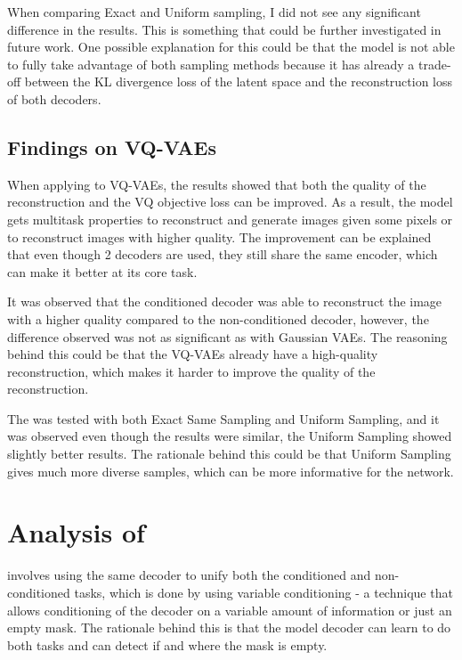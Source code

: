 When comparing Exact and Uniform sampling, I did not see any significant difference in the results. This is something that could be further investigated in future work. One possible explanation for this could be that the model is not able to fully take advantage of both sampling methods because it has already a trade-off between the KL divergence loss of the latent space and the reconstruction loss of both decoders.

\subsection{Findings on VQ-VAEs}

When applying  to VQ-VAEs, the results showed that both the quality of the reconstruction and the VQ objective loss can be improved. As a result, the model gets multitask properties to reconstruct and generate images given some pixels or to reconstruct images with higher quality. The improvement can be explained that even though 2 decoders are used, they still share the same encoder, which can make it better at its core task. 

It was observed that the conditioned decoder was able to reconstruct the image with a higher quality compared to the non-conditioned decoder, however, the difference observed was not as significant as with Gaussian VAEs. The reasoning behind this could be that the VQ-VAEs already have a high-quality reconstruction, which makes it harder to improve the quality of the reconstruction.

The  was tested with both Exact Same Sampling and Uniform Sampling, and it was observed even though the results were similar, the Uniform Sampling showed slightly better results. The rationale behind this could be that Uniform Sampling gives much more diverse samples, which can be more informative for the network.


\section{Analysis of }

 involves using the same decoder to unify both the conditioned and non-conditioned tasks, which is done by using variable conditioning - a technique that allows conditioning of the decoder on a variable amount of information or just an empty mask. The rationale behind this is that the model decoder can learn to do both tasks and can detect if and where the mask is empty.

